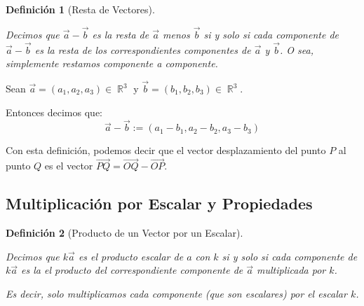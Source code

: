 \documentclass[12pt, fleqn]{report}                             %
\newtheorem{Definition}{Definición}[section]                    %
\DeclareMathOperator \Reals        {\mathbb{R}}                 %
\newcommand{\lVec}[1]{\overrightarrow{#1}}                      %
\begin{document}
                \vspace{2em}

                \begin{Definition}[Resta de Vectores]
                    \label{DefRestaVectores}

                    Decimos que $\vec{a}-\vec{b}$ es la resta de $\vec{a}$ menos $\vec{b}$ si y solo si 
                    cada componente de $\vec{a}-\vec{b}$ es la resta de los correspondientes componentes
                    de $\vec{a}$ y $\vec{b}$.
                    O sea, simplemente restamos componente a componente.
                    
                \end{Definition}

                Sean $\vec{a} = (a_1, a_2, a_3) \in \Reals^3$ y $\vec{b}=(b_1, b_2, b_3) \in \Reals^3$.

                Entonces decimos que:
                \begin{equation*}
                    \vec{a} - \vec{b} := (a_1 - b_1, a_2 - b_2, a_3 - b_3)
                \end{equation*}
            
                Con esta definición, podemos decir que el vector desplazamiento del punto $P$ al punto $Q$
                es el vector $\lVec{PQ} = \lVec{OQ} - \lVec{OP}$.
                
            \clearpage
            \subsection{Multiplicación por Escalar y Propiedades}

                \begin{Definition}[Producto de un Vector por un Escalar]
                    \label{DefProductoVectorEscalar}

                    Decimos que $k \vec{a}$ es el producto escalar de $a$ con $k$
                    si y solo si cada componente de $k \vec{a}$ es la el producto del correspondiente componente
                    de $\vec{a}$ multiplicada por $k$.

                    Es decir, solo multiplicamos cada componente (que son escalares) por el escalar $k$.

                \end{Definition}
\end{document}
